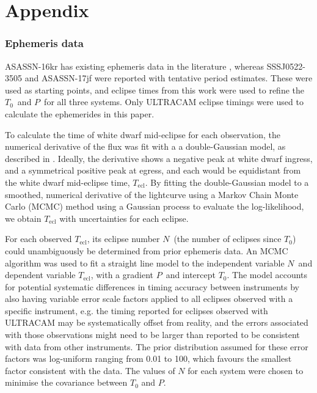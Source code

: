 

\chapter{Appendix}
\label{app:my_appendix}




\subsection{Ephemeris data}
\label{sect:appendix:ephemeris data}

ASASSN-16kr has existing ephemeris data in the literature \citep{kato2017}, whereas SSSJ0522-3505 and ASASSN-17jf were reported with tentative period estimates. These were used as starting points, and eclipse times from this work were used to refine the $T_\mathrm{0}$\ and $P$\ for all three systems. Only ULTRACAM eclipse timings were used to calculate the ephemerides in this paper.

To calculate the time of white dwarf mid-eclipse for each observation, the numerical derivative of the flux was fit with a a double-Gaussian model, as described in \citet{wood1985}.
Ideally, the derivative shows a negative peak at white dwarf ingress, and a symmetrical positive peak at egress, and each would be equidistant from the white dwarf mid-eclipse time, $T_\mathrm{ecl}$. By fitting the double-Gaussian model to a smoothed, numerical derivative of the lightcurve using a Markov Chain Monte Carlo (MCMC) method using a Gaussian process to evaluate the log-likelihood, we obtain $T_\mathrm{ecl}$ with uncertainties for each eclipse.

For each observed $T_\mathrm{ecl}$, its eclipse number $N$\ (the number of eclipses since $T_0$) could unambiguously be determined from prior ephemeris data.
An MCMC algorithm was used to fit a straight line model to the independent variable $N$\ and dependent variable $T_\mathrm{ecl}$, with a gradient $P$\ and intercept $T_0$. The model accounts for potential systematic differences in timing accuracy between instruments by also having variable error scale factors applied to all eclipses observed with a specific instrument, e.g. the timing reported for eclipses observed with ULTRACAM may be systematically offset from reality, and the errors associated with those observations might need to be larger than reported to be consistent with data from other instruments. The prior distribution assumed for these error factors was log-uniform ranging from 0.01 to 100, which favours the smallest factor consistent with the data. The values of $N$ for each system were chosen to minimise the covariance between $T_0$ and $P$.



